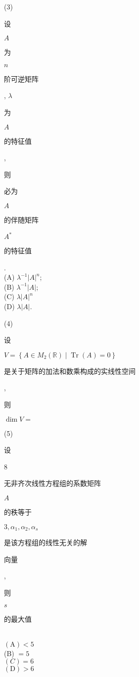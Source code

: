 \documentclass[10pt]{article}
\begin{document}
(3) \begin{CJK}{UTF8}{mj}设\end{CJK} $A$ \begin{CJK}{UTF8}{mj}为\end{CJK} $n$ \begin{CJK}{UTF8}{mj}阶可逆矩阵\end{CJK}, $\lambda$ \begin{CJK}{UTF8}{mj}为\end{CJK} $A$ \begin{CJK}{UTF8}{mj}的特征值\end{CJK}, \begin{CJK}{UTF8}{mj}则\end{CJK} \begin{CJK}{UTF8}{mj}必为\end{CJK} $A$ \begin{CJK}{UTF8}{mj}的伴随矩阵\end{CJK} $A^{*}$ \begin{CJK}{UTF8}{mj}的特征值\end{CJK}.\\
(A) $\lambda^{-1}|A|^{n}$;\\
(B) $\lambda^{-1}|A|$;\\
(C) $\lambda|A|^{n}$\\
(D) $\lambda|A|$.

(4) \begin{CJK}{UTF8}{mj}设\end{CJK} $V=\left\{A \in M_{2}(\mathbb{R}) \mid \operatorname{Tr}(A)=0\right\}$ \begin{CJK}{UTF8}{mj}是关于矩阵的加法和数乘构成的实线性空间\end{CJK}, \begin{CJK}{UTF8}{mj}则\end{CJK} $\operatorname{dim} V=$

(5) \begin{CJK}{UTF8}{mj}设\end{CJK} 8 \begin{CJK}{UTF8}{mj}无非齐次线性方程组的系数矩阵\end{CJK} $A$ \begin{CJK}{UTF8}{mj}的秩等于\end{CJK} $3, \alpha_{1}, \alpha_{2}, \alpha_{s}$ \begin{CJK}{UTF8}{mj}是该方程组的线性无关的解\end{CJK} \begin{CJK}{UTF8}{mj}向量\end{CJK}, \begin{CJK}{UTF8}{mj}则\end{CJK} $s$ \begin{CJK}{UTF8}{mj}的最大值\end{CJK}\\
$(\mathrm{A})<5$\\
(B) $=5$\\
$(C)=6$\\
$(\mathrm{D})>6$
\end{document}
